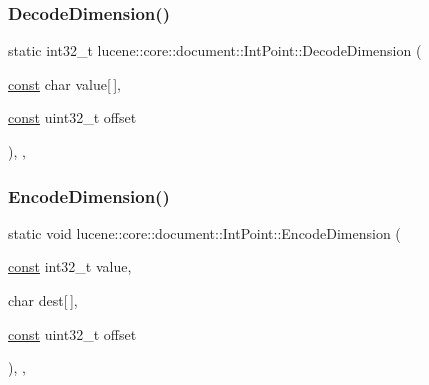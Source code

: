 \subsubsection{\texorpdfstring{Decode\+Dimension()}{DecodeDimension()}}
{\footnotesize\ttfamily static int32\+\_\+t lucene\+::core\+::document\+::\+Int\+Point\+::\+Decode\+Dimension (\begin{DoxyParamCaption}\item[{\mbox{\hyperlink{ZlibCrc32_8h_a2c212835823e3c54a8ab6d95c652660e}{const}} char}]{value\mbox{[}$\,$\mbox{]},  }\item[{\mbox{\hyperlink{ZlibCrc32_8h_a2c212835823e3c54a8ab6d95c652660e}{const}} uint32\+\_\+t}]{offset }\end{DoxyParamCaption})\hspace{0.3cm}{\ttfamily [inline]}, {\ttfamily [static]}, {\ttfamily [noexcept]}}

\mbox{\label{classlucene_1_1core_1_1document_1_1IntPoint_a44c8e743c679988d9a8d42c353735d28}} 
\subsubsection{\texorpdfstring{Encode\+Dimension()}{EncodeDimension()}}
{\footnotesize\ttfamily static void lucene\+::core\+::document\+::\+Int\+Point\+::\+Encode\+Dimension (\begin{DoxyParamCaption}\item[{\mbox{\hyperlink{ZlibCrc32_8h_a2c212835823e3c54a8ab6d95c652660e}{const}} int32\+\_\+t}]{value,  }\item[{char}]{dest\mbox{[}$\,$\mbox{]},  }\item[{\mbox{\hyperlink{ZlibCrc32_8h_a2c212835823e3c54a8ab6d95c652660e}{const}} uint32\+\_\+t}]{offset }\end{DoxyParamCaption})\hspace{0.3cm}{\ttfamily [inline]}, {\ttfamily [static]}, {\ttfamily [noexcept]}}

\mbox{\label{classlucene_1_1core_1_1document_1_1IntPoint_aea4e98fc61985c22e12bf248d1c4a1bc}} 
